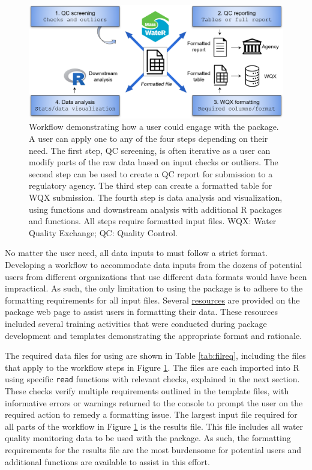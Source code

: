 \begin{figure}
\includegraphics[width=1\linewidth]{figs/workflow} \caption{Workflow demonstrating how a user could engage with the  package.  A user can apply one to any of the four steps depending on their need.  The first step, QC screening, is often iterative as a user can modify parts of the raw data based on input checks or outliers.  The second step can be used to create a QC report for submission to a regulatory agency.  The third step can create a formatted table for WQX submission.  The fourth step is data analysis and visualization, using  functions and downstream analysis with additional R packages and functions.  All steps require formatted input files.  WQX: Water Quality Exchange; QC: Quality Control.}\label{fig:workflow}
\end{figure}

No matter the user need, all data inputs to  must follow a strict format. Developing a workflow to accommodate data inputs from the dozens of potential users from different organizations that use different data formats would have been impractical. As such, the only limitation to using the package is to adhere to the formatting requirements for all input files. Several \href{https://massbays-tech.github.io/MassWateR/RESOURCES.html}{resources} are provided on the package web page to assist users in formatting their data. These resources included several training activities that were conducted during package development and templates demonstrating the appropriate format and rationale.

The required data files for using  are shown in Table \ref{tab:filreq}, including the files that apply to the workflow steps in Figure \ref{fig:workflow}. The files are each imported into R using specific \texttt{read} functions with relevant checks, explained in the next section. These checks verify multiple requirements outlined in the template files, with informative errors or warnings returned to the console to prompt the user on the required action to remedy a formatting issue. The largest input file required for all parts of the workflow in Figure \ref{fig:workflow} is the results file. This file includes all water quality monitoring data to be used with the package. As such, the formatting requirements for the results file are the most burdensome for potential users and additional functions are available to assist in this effort.

